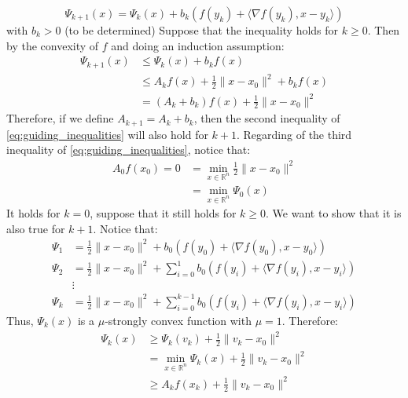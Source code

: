 \documentclass[12pt, openany]{report}
\newcommand{\R}{\mathbb{R}}
\theoremstyle{definition}
\begin{document}
\begin{equation}
	\Psi_{k+1} (x) = \Psi_k(x) + b_k \left(f(y_k)+\langle \nabla f(y_k),x-y_k\rangle \right)
\end{equation}
with $b_k > 0$ (to be determined)
Suppose that the inequality holds for $k \geq 0$. Then by the convexity of $f$ and doing an induction assumption:
\begin{equation}
	\begin{aligned}
		\Psi_{k+1}(x) &\leq \Psi_k(x) + b_k f(x)\\
		&\leq A_k f(x) + \frac{1}{2} \|x-x_0\|^2 +b_kf(x)\\
		&= (A_k+b_k)f(x) + \frac{1}{2} \|x-x_0\|^2
	\end{aligned}
\end{equation}
Therefore, if we define $A_{k+1}=A_k+b_k$, then the second inequality of \eqref{eq:guiding_inequalities} will also hold for $k+1$. Regarding of the third inequality of \eqref{eq:guiding_inequalities}, notice that:
\begin{equation}
	\begin{aligned}
		A_0f(x_0) = 0 &= \min_{x \in \R^n} \frac{1}{2} \|x-x_0\|^2\\
		&= 	\min_{x \in \R^n} \Psi_0(x)
	\end{aligned}
\end{equation}
It holds for $k=0$, suppose that it still holds for $k\geq 0$. We want to show that it is also true for $k+1$. Notice that:
\begin{equation}
	\begin{aligned}
		\Psi_1 &= \frac{1}{2} \|x-x_0\|^2 + b_0 \left(f(y_0)+ \langle \nabla f(y_0), x-y_0 \rangle\right)\\
		\Psi_2 &= \frac{1}{2} \|x-x_0\|^2 + \sum_{i=0}^{1} b_0 \left(f(y_i)+ \langle \nabla f(y_i), x-y_i \rangle\right)\\
		&\vdots\\
		\Psi_k &= \frac{1}{2} \|x-x_0\|^2 + \sum_{i=0}^{k-1} b_0 \left(f(y_i)+ \langle \nabla f(y_i), x-y_i \rangle\right)
	\end{aligned}
\end{equation}
Thus, $\Psi_k(x)$ is a $\mu$-strongly convex function with $\mu=1$. Therefore:
\begin{equation}
	\begin{aligned}
		\Psi_k(x) &\geq \Psi_k(v_k) + \frac{1}{2} \|v_k-x_0\|^2\\
		&= \min_{x\in\R^n} \Psi_k(x) + \frac{1}{2} \|v_k-x_0\|^2\\
		&\geq A_k f(x_k) + \frac{1}{2} \|v_k-x_0\|^2
	\end{aligned}
\end{equation}
\end{document}
